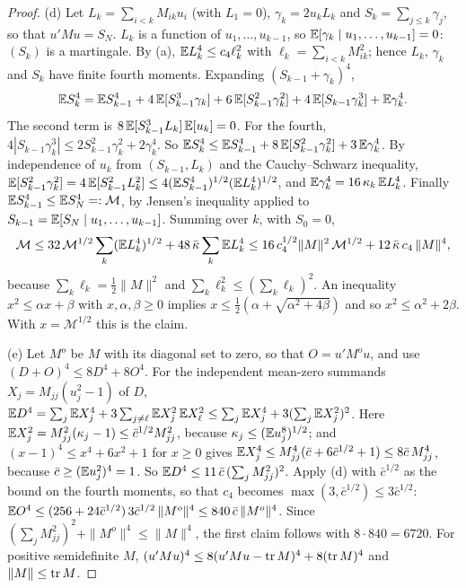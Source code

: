 \begin{proof}
(d) Let $L_k=\sum_{i<k}M_{ik}u_i$ (with $L_1=0$), $\gamma_k=2u_kL_k$ and $S_k=\sum_{j\le k}\gamma_j$, so that
$u'Mu=S_N$. $L_k$ is a function of $u_1,\dots,u_{k-1}$, so $\mathbb{E}[\gamma_k\mid u_1,\dots,u_{k-1}]=0$:
$(S_k)$ is a martingale. By (a), $\mathbb{E} L_k^4\le c_4\ell_k^2$ with $\ell_k=\sum_{i<k}M_{ik}^2$; hence
$L_k$, $\gamma_k$ and $S_k$ have finite fourth moments. Expanding $(S_{k-1}+\gamma_k)^4$,
\[
\mathbb{E} S_k^4=\mathbb{E} S_{k-1}^4+4\,\mathbb{E}[S_{k-1}^3\gamma_k]+6\,\mathbb{E}[S_{k-1}^2\gamma_k^2]+4\,\mathbb{E}[S_{k-1}\gamma_k^3]+\mathbb{E}\gamma_k^4 .
\]
The second term is $8\,\mathbb{E}[S_{k-1}^3L_k]\,\mathbb{E}[u_k]=0$. For the fourth,
$4|S_{k-1}\gamma_k^3|\le2S_{k-1}^2\gamma_k^2+2\gamma_k^4$. So
$\mathbb{E} S_k^4\le\mathbb{E} S_{k-1}^4+8\,\mathbb{E}[S_{k-1}^2\gamma_k^2]+3\,\mathbb{E}\gamma_k^4$. By independence of $u_k$ from
$(S_{k-1},L_k)$ and the Cauchy--Schwarz inequality,
$\mathbb{E}[S_{k-1}^2\gamma_k^2]=4\,\mathbb{E}[S_{k-1}^2L_k^2]\le4(\mathbb{E} S_{k-1}^4)^{1/2}(\mathbb{E} L_k^4)^{1/2}$, and
$\mathbb{E}\gamma_k^4=16\,\kappa_k\,\mathbb{E} L_k^4$. Finally $\mathbb{E} S_{k-1}^4\le\mathbb{E} S_N^4=:\mathcal{M}$, by Jensen's inequality
applied to $S_{k-1}=\mathbb{E}[S_N\mid u_1,\dots,u_{k-1}]$. Summing over $k$, with $S_0=0$,
\[
\mathcal{M}\le32\,\mathcal{M}^{1/2}\sum_k(\mathbb{E} L_k^4)^{1/2}+48\,\bar\kappa\sum_k\mathbb{E} L_k^4
\le16\,c_4^{1/2}\|M\|^2\,\mathcal{M}^{1/2}+12\,\bar\kappa\,c_4\,\|M\|^4 ,
\]
because $\sum_k\ell_k=\frac12\|M\|^2$ and $\sum_k\ell_k^2\le(\sum_k\ell_k)^2$. An inequality
$x^2\le\alpha x+\beta$ with $x,\alpha,\beta\ge0$ implies $x\le\frac12(\alpha+\sqrt{\alpha^2+4\beta})$ and so
$x^2\le\alpha^2+2\beta$. With $x=\mathcal{M}^{1/2}$ this is the claim.

(e) Let $M^{o}$ be $M$ with its diagonal set to zero, so that $O=u'M^{o}u$, and use
$(D+O)^4\le8D^4+8O^4$. For the independent mean-zero summands $X_j=M_{jj}(u_j^2-1)$ of $D$,
$\mathbb{E} D^4=\sum_j\mathbb{E} X_j^4+3\sum_{j\ne\ell}\mathbb{E} X_j^2\,\mathbb{E} X_\ell^2\le\sum_j\mathbb{E} X_j^4+3(\sum_j\mathbb{E} X_j^2)^2$. Here
$\mathbb{E} X_j^2=M_{jj}^2(\kappa_j-1)\le\bar c^{1/2}M_{jj}^2$, because $\kappa_j\le(\mathbb{E} u_j^8)^{1/2}$; and
$(x-1)^4\le x^4+6x^2+1$ for $x\ge0$ gives $\mathbb{E} X_j^4\le M_{jj}^4(\bar c+6\bar c^{1/2}+1)\le8\bar c\,M_{jj}^4$,
because $\bar c\ge(\mathbb{E} u_j^2)^4=1$. So $\mathbb{E} D^4\le11\,\bar c\,(\sum_jM_{jj}^2)^2$. Apply (d) with
$\bar c^{1/2}$ as the bound on the fourth moments, so that $c_4$ becomes
$\max(3,\bar c^{1/2})\le3\bar c^{1/2}$: $\mathbb{E} O^4\le(256+24\bar c^{1/2})\,3\bar c^{1/2}\,\|M^{o}\|^4
\le840\,\bar c\,\|M^{o}\|^4$. Since
$(\sum_jM_{jj}^2)^2+\|M^{o}\|^4\le\|M\|^4$, the first claim follows with $8\cdot840=6720$. For
positive semidefinite $M$, $(u'Mu)^4\le8(u'Mu-\operatorname{tr} M)^4+8(\operatorname{tr} M)^4$ and $\|M\|\le\operatorname{tr} M$.
\end{proof}

